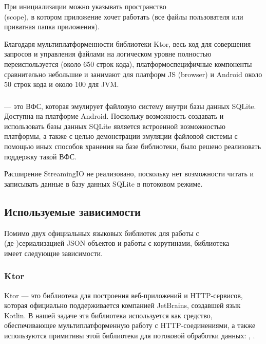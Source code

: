     При инициализации  можно указывать пространство\\ (scope), в котором приложение хочет работать (все файлы пользователя или приватная папка приложения).

    Благодаря мультиплатформенности библиотеки Ktor, весь код для совершения запросов и управления файлами на логическом уровне полностью переиспользуется (около 650 строк кода), платформоспецифичные компоненты сравнительно небольшие и занимают для платформ JS (browser) и Android около 50 строк кода и около 100 для JVM.
  \subsubsection{}
     --- это ВФС, которая эмулирует файловую систему внутри базы данных SQLite. Доступна на платформе Android. Поскольку возможность создавать и использовать базы данных SQLite является встроенной возможностью платформы, а также с целью демонстрации эмуляции файловой системы с помощью иных способов хранения на базе библиотеки, было решено реализовать поддержку такой ВФС. 

    Расширение StreamingIO не реализовано, поскольку нет возможности читать и записывать данные в базу данных SQLite в потоковом режиме.


\subsection{Используемые зависимости}
  Помимо двух официальных языковых библиотек для работы с\\ (де-)сериализацией JSON объектов и работы с корутинами, библиотека\\  имеет следующие зависимости.
  \subsubsection{Ktor}\label{dependencies-ktor}
    Ktor\cite{ktor} --- это библиотека для построения веб-приложений и HTTP-сервисов, которая официально поддерживается компанией JetBrains, создавшей язык Kotlin. В нашей задаче эта библиотека используется как средство, обеспечивающее мультиплатформенную работу с HTTP-соединениями, а также используются примитивы этой библиотеки для потоковой обработки данных: , .

